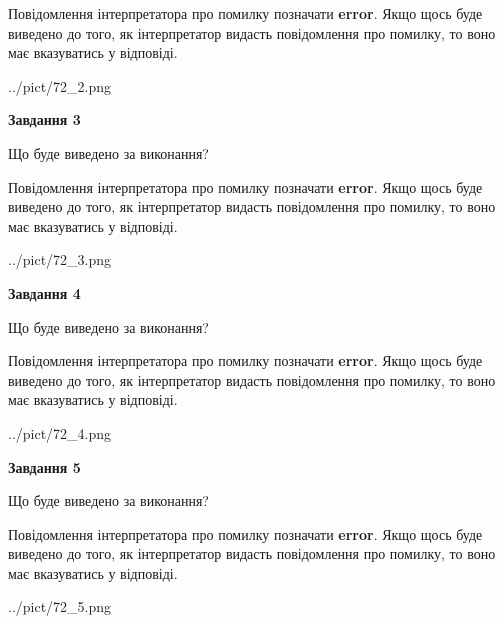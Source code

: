 \documentclass[12pt, ukrainian]{article}
\begin{document}
{\begin {large}
Повідомлення інтерпретатора про помилку позначати \textbf{error}.
Якщо щось буде виведено до того, як інтерпретатор видасть повідомлення про помилку, 
то воно має вказуватись у відповіді. \par


\begin{center}
	{../pict/72_2.png}
\end{center}
\newpage

{\begin {center}\textbf{Завдання 3}\end {center}}\par
Що буде виведено за виконання?

Повідомлення інтерпретатора про помилку позначати \textbf{error}.
Якщо щось буде виведено до того, як інтерпретатор видасть повідомлення про помилку, 
то воно має вказуватись у відповіді. \par


\begin{center}
	{../pict/72_3.png}
\end{center}
\newpage

{\begin {center}\textbf{Завдання 4}\end {center}}\par
Що буде виведено за виконання?

Повідомлення інтерпретатора про помилку позначати \textbf{error}.
Якщо щось буде виведено до того, як інтерпретатор видасть повідомлення про помилку, 
то воно має вказуватись у відповіді. \par


\begin{center}
	{../pict/72_4.png}
\end{center}
\newpage

{\begin {center}\textbf{Завдання 5}\end {center}}\par
Що буде виведено за виконання?

Повідомлення інтерпретатора про помилку позначати \textbf{error}.
Якщо щось буде виведено до того, як інтерпретатор видасть повідомлення про помилку, 
то воно має вказуватись у відповіді. \par


\begin{center}
	{../pict/72_5.png}
\end{center}
\newpage


\end{large}}
\end{document}
